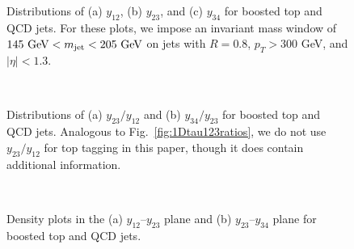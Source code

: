 \documentclass{JHEP3}
\newcommand{\vsh}{\vspace{-.5cm}}
\DeclareRobustCommand{\Fig}[1]{Fig.~\ref{#1}}
\begin{document}
\begin{figure}[tp]
  \begin{center}
  \end{center}
  \vsh
\caption{Distributions of (a) $y_{12}$, (b) $y_{23}$, and (c) $y_{34}$ for boosted top and QCD jets.  For these plots, we impose an invariant mass window of $145 \text{ GeV} < m_{\rm jet} < 205 \text{ GeV} $ on jets with $R = 0.8$, $p_T > 300$ GeV, and $|\eta| < 1.3$.}
  \label{fig:1Dy1y2y3top}
\end{figure}

\begin{figure}[tp]
  \begin{center}
       \\
  \end{center}
  \vsh
  \caption{Distributions of  (a) $y_{23}/y_{12}$ and (b) $y_{34}/y_{23}$ for boosted top and QCD jets.  Analogous to \Fig{fig:1Dtau123ratios}, we do not use $y_{23}/y_{12}$ for top tagging in this paper, though it does contain additional information.}
  \label{fig:top1Dy12}
\end{figure}

\begin{figure}[tp]
  \begin{center}
       \\
  \end{center}
  \vsh
  \caption{Density plots in the (a) $y_{12}$--$y_{23}$ plane and (b) $y_{23}$--$y_{34}$ plane for boosted top and QCD jets.}
  \label{fig:top2Dy12}
\end{figure}

\clearpage
\end{document}
